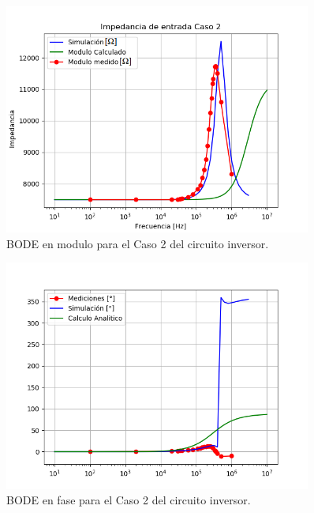 \begin{figure}[H]	
	\centering
	\includegraphics[width=0.9\textwidth]{Ejercicio1/Imagenes/CZinC2.png}
	\caption{BODE en modulo para el Caso 2 del circuito inversor.}
	\label{fig:CompZinC2}
\end{figure} 

\begin{figure}[H]	
	\centering
	\includegraphics[width=0.9\textwidth]{Ejercicio1/Imagenes/ZinphC2.png}
	\caption{BODE en fase para el Caso 2 del circuito inversor.}
	\label{fig:CompZinphC2}
\end{figure} 

